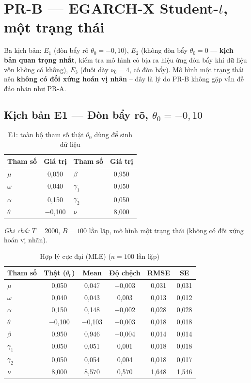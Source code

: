 \documentclass[11pt,a4paper]{article}
\begin{document}
\clearpage
\section{PR-B --- EGARCH-X Student-$t$, một trạng thái}

Ba kịch bản: $E_1$ (đòn bẩy rõ $\theta_0=-0{,}10$), $E_2$ (không đòn bẩy
$\theta_0=0$ --- \textbf{kịch bản quan trọng nhất}, kiểm tra mô hình có bịa ra
hiệu ứng đòn bẩy khi dữ liệu vốn không có không), $E_3$ (đuôi dày $\nu_0=4$, có
đòn bẩy). Mô hình một trạng thái nên \textbf{không có đối xứng hoán vị nhãn} --
đây là lý do PR-B không gặp vấn đề đảo nhãn như PR-A.

\subsection*{Kịch bản E1 --- Đòn bẩy rõ, $\theta_0=-0{,}10$}
\begin{table}[H]\centering\small
\caption{E1: toàn bộ tham số thật $\theta_0$ dùng để sinh dữ liệu}
\begin{tabularx}{\textwidth}{l C  l C}
\toprule
\textbf{Tham số} & \textbf{Giá trị} & \textbf{Tham số} & \textbf{Giá trị} \\
\midrule
$\mu$ & 0,050 & $\beta$ & 0,950 \\
$\omega$ & 0,040 & $\gamma_1$ & 0,050 \\
$\alpha$ & 0,150 & $\gamma_2$ & 0,050 \\
$\theta$ & $-$0,100 & $\nu$ & 8,000 \\
\bottomrule
\end{tabularx}
\vspace{0.2em}\raggedright\scriptsize \emph{Ghi chú:} $T=2000$, $B=100$ lần lặp, mô hình một trạng thái (không có đối xứng hoán vị nhãn).
\end{table}

\begin{table}[H]\centering\scriptsize
\caption{Hợp lý cực đại (MLE) ($n=100$ lần lặp)}
\begin{tabularx}{\textwidth}{l C C C C C}
\toprule
\textbf{Tham số} & \textbf{Thật ($\theta_0$)} & \textbf{Mean} & \textbf{Độ chệch} & \textbf{RMSE} & \textbf{SE} \\
\midrule
$\mu$ & 0,050 & 0,047 & $-$0,003 & 0,031 & 0,031 \\
$\omega$ & 0,040 & 0,043 & 0,003 & 0,013 & 0,012 \\
$\alpha$ & 0,150 & 0,148 & $-$0,002 & 0,028 & 0,028 \\
$\theta$ & $-$0,100 & $-$0,103 & $-$0,003 & 0,018 & 0,018 \\
$\beta$ & 0,950 & 0,946 & $-$0,004 & 0,014 & 0,014 \\
$\gamma_1$ & 0,050 & 0,051 & 0,001 & 0,018 & 0,018 \\
$\gamma_2$ & 0,050 & 0,054 & 0,004 & 0,018 & 0,017 \\
$\nu$ & 8,000 & 8,570 & 0,570 & 1,648 & 1,546 \\
\bottomrule
\end{tabularx}
\end{table}
\end{document}
